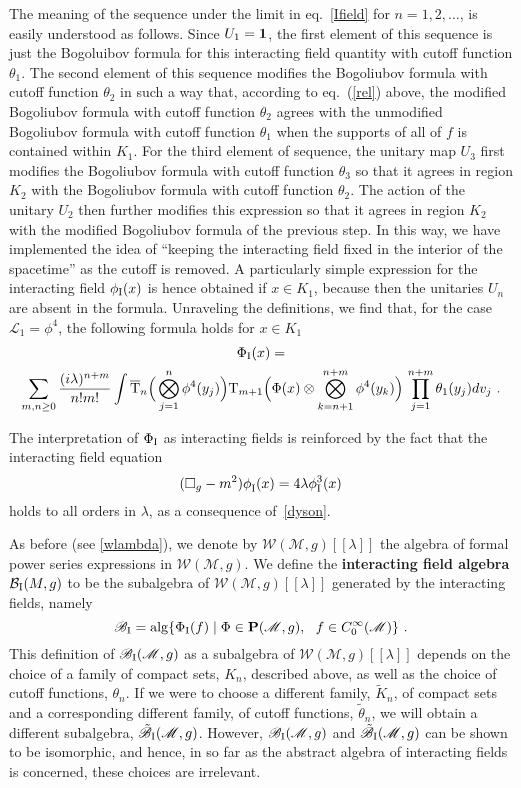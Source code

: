 \documentclass[12pt]{article}
\newcommand{\cB}{\mathcal{B}}
\newcommand{\rI}{{\rm I}}
\newcommand{\eB}{\mathscr{B}}
\newcommand{\eL}{\mathscr{L}}
\newcommand{\eW}{\mathscr{W}}
\newcommand{\M}{\mathscr{M}}
\newcommand{\myid}{{\bf 1}}
\renewcommand{\O}{\Phi}
\newcommand{\T}{{\rm T}}
\renewcommand{\P}{{\bf P}}
\newcommand{\rf}[1]{[\![#1]\!]}
\theoremstyle{plain}
\theoremstyle{definition}
\def\ben{\begin{equation}}
\def\een{\end{equation}}
\begin{document}
The meaning of the sequence under the limit in eq.~\eqref{Ifield} for $n = 1, 2, \dots$, is easily understood as follows. Since
$U_1 = \myid$, the first element of this sequence is just the
Bogoluibov formula for this interacting field quantity with cutoff
function $\theta_1$. The second element of this sequence modifies the
Bogoliubov formula with cutoff function $\theta_2$ in such a way that,
according to eq.~(\ref{rel}) above, the modified Bogoliubov formula
with cutoff function $\theta_2$ agrees with the unmodified Bogoliubov
formula with cutoff function $\theta_1$ when the supports of all of
$f$ is contained within $K_1$. For the third element of 
sequence, the unitary map $U_3$ first modifies the Bogoliubov formula
with cutoff function $\theta_3$ so that it agrees in region $K_2$ with
the Bogoliubov formula with cutoff function $\theta_2$. The action of
the unitary $U_2$ then further modifies this expression so that it
agrees in region $K_2$ with the modified Bogoliubov formula of the
previous step. In this way, we have implemented the idea of ``keeping
the interacting field fixed in the interior of the spacetime'' as the
cutoff is removed. A particularly simple expression for the interacting field
$\phi_\rI(x)$ is hence obtained if $x \in K_1$, because then the unitaries
$U_n$ are absent in the formula. Unraveling the definitions, we find that, for the
case $\eL_1 = \phi^4$, the following
formula holds for $x \in K_1$
\begin{multline}
\label{ifield}
\O_\rI(x) = \\
\sum_{m,n \ge 0} \frac{(i\lambda)^{n+m}}{n!m!} \int \overline
\T_n\Big( \bigotimes_{j=1}^n \phi^4(y_j) \Big)
\T_{m+1}\Big( \O(x) \otimes \bigotimes_{k=n+1}^{n+m} \phi^4(y_k)  \Big) \, \prod_{j=1}^{n+m} \theta_1(y_j) dv_j \ .
\end{multline}

The interpretation of $\O_\rI$ as interacting fields is reinforced by the fact that the interacting field
equation
\ben
(\square_g - m^2) \phi_\rI^{}(x) = 4\lambda \phi^3_\rI(x)
\een
holds to all orders in $\lambda$, as a consequence of~\eqref{dyson}. 

As before (see \eqref{wlambda}), we denote by $\eW(\M, g)\rf{\lambda}$ the algebra of formal power series expressions in $\eW(\M, g)$. We define the {\bf interacting field algebra} $\cB_{\rI}(M, g)$ to be
the subalgebra of $\eW(\M, g)\rf{\lambda}$ generated by the interacting
fields, namely
\ben
\eB_\rI = {\rm alg} \{ \O_\rI(f) \mid \O \in \P(\M,g), \ \ f \in C^\infty_0(\M) \} \ .
\een
This definition of $\eB_{\rI}(\M, g)$ as a subalgebra of $\eW(\M, g)\rf{\lambda}$
depends on the choice of a family of compact sets, $K_n$, described above, as well as the choice of cutoff functions,
$\theta_n$. If we were to choose a different family, $\tilde{K}_n$, of
compact sets and a corresponding different family,
of cutoff functions, $\tilde{\theta}_n$, we will obtain a different subalgebra, $\tilde{\eB}_{\rI}(\M, g)$. However,
$\eB_{\rI}(\M, g)$ and $\tilde{\eB}_{\rI}(\M, g)$ can be shown to be isomorphic, and hence, in so far as the abstract
algebra of interacting fields is concerned, these choices are irrelevant.
\end{document}

